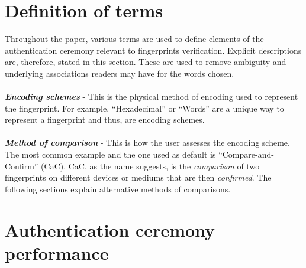 \section*{Definition of terms}
Throughout the paper, various terms are used to define elements of the authentication ceremony relevant to fingerprints verification. Explicit descriptions are, therefore, stated in this section. These are used to remove ambiguity and underlying associations readers may have for the words chosen.
\\\\
\textbf{\textit{Encoding schemes}} - This is the physical method of encoding used to represent the fingerprint. For example, ``Hexadecimal'' or ``Words'' are a unique way to represent a fingerprint and thus, are encoding schemes.
\\\\
\textbf{\textit{Method of comparison}} - This is how the user assesses the encoding scheme. The most common example and the one used as default is ``Compare-and-Confirm'' (CaC). CaC, as the name suggests, is the \textit{comparison} of two fingerprints on different devices or mediums that are then \textit{confirmed}. The following sections explain alternative methods of comparisons.

\section{Authentication ceremony performance}

